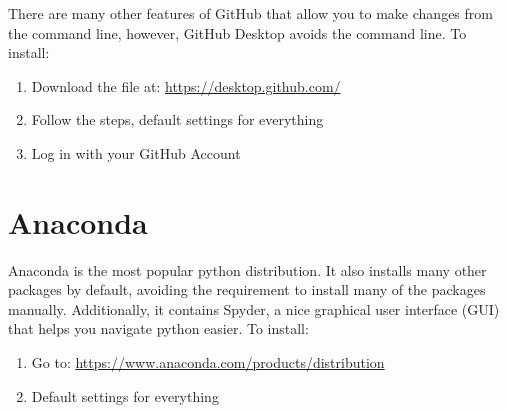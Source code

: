\documentclass[11pt]{paper}
\begin{document}
There are many other features of GitHub that allow you to make changes from the command line, however, GitHub Desktop avoids the command line. To install:

\begin{enumerate}
\item Download the file at: \href{https://desktop.github.com/}{https://desktop.github.com/}
\item Follow the steps, default settings for everything
\item Log in with your GitHub Account
\end{enumerate}

\section{Anaconda}

Anaconda is the most popular python distribution. It also installs many other packages by default, avoiding the requirement to install many of the packages manually. Additionally, it contains Spyder, a nice graphical user interface (GUI) that helps you navigate python easier. To install:

\begin{enumerate}
\item Go to: \href{https://www.anaconda.com/products/distribution}{https://www.anaconda.com/products/distribution}
\item Default settings for everything
\end{enumerate}
\end{document}
